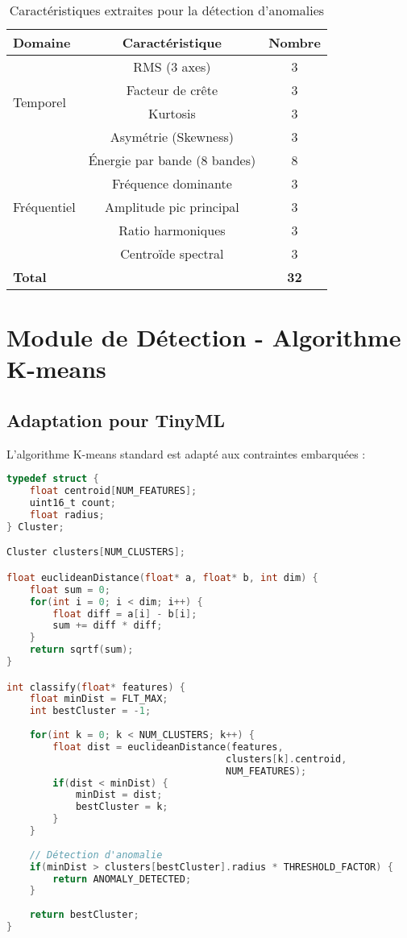 \begin{table}[h]
\centering
\caption{Caractéristiques extraites pour la détection d'anomalies}
\begin{tabular}{lcc}
\toprule
\textbf{Domaine} & \textbf{Caractéristique} & \textbf{Nombre} \\
\midrule
\multirow{4}{*}{Temporel} & RMS (3 axes) & 3 \\
                          & Facteur de crête & 3 \\
                          & Kurtosis & 3 \\
                          & Asymétrie (Skewness) & 3 \\
\midrule
\multirow{5}{*}{Fréquentiel} & Énergie par bande (8 bandes) & 8 \\
                              & Fréquence dominante & 3 \\
                              & Amplitude pic principal & 3 \\
                              & Ratio harmoniques & 3 \\
                              & Centroïde spectral & 3 \\
\midrule
\textbf{Total} & & \textbf{32} \\
\bottomrule
\end{tabular}
\end{table}

\section{Module de Détection - Algorithme K-means}

\subsection{Adaptation pour TinyML}

L'algorithme K-means standard est adapté aux contraintes embarquées :

\begin{lstlisting}[language=C, caption=K-means optimisé pour ESP32]
typedef struct {
    float centroid[NUM_FEATURES];
    uint16_t count;
    float radius;
} Cluster;

Cluster clusters[NUM_CLUSTERS];

float euclideanDistance(float* a, float* b, int dim) {
    float sum = 0;
    for(int i = 0; i < dim; i++) {
        float diff = a[i] - b[i];
        sum += diff * diff;
    }
    return sqrtf(sum);
}

int classify(float* features) {
    float minDist = FLT_MAX;
    int bestCluster = -1;
    
    for(int k = 0; k < NUM_CLUSTERS; k++) {
        float dist = euclideanDistance(features, 
                                      clusters[k].centroid, 
                                      NUM_FEATURES);
        if(dist < minDist) {
            minDist = dist;
            bestCluster = k;
        }
    }
    
    // Détection d'anomalie
    if(minDist > clusters[bestCluster].radius * THRESHOLD_FACTOR) {
        return ANOMALY_DETECTED;
    }
    
    return bestCluster;
}
\end{lstlisting}


